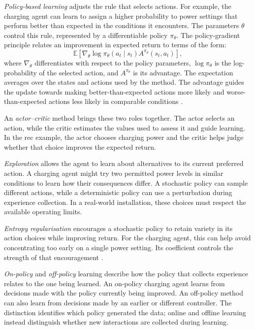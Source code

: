 \emph{Policy-based learning} adjusts the rule that selects actions. For example, the charging agent can learn to assign a higher probability to power settings that perform better than expected in the conditions it encounters. The parameters $\theta$ control this rule, represented by a differentiable policy $\pi_\theta$. The policy-gradient principle relates an improvement in expected return to terms of the form:
\begin{equation}
\mathbb E\!\left[\nabla_\theta\log\pi_\theta(a_t\mid s_t)
A^{\pi_\theta}(s_t,a_t)\right],
\label{eq:ch2-policy-gradient}
\end{equation}
where $\nabla_\theta$ differentiates with respect to the policy parameters, $\log\pi_\theta$ is the log-probability of the selected action, and $A^{\pi_\theta}$ is its advantage. The expectation averages over the states and actions used by the method. The advantage guides the update towards making better-than-expected actions more likely and worse-than-expected actions less likely in comparable conditions \parencite{sutton1999policygradient}.

An \emph{actor--critic} method brings these two roles together. The actor selects an action, while the critic estimates the values used to assess it and guide learning. In the \gls{rec} example, the actor chooses charging power and the critic helps judge whether that choice improves the expected return.

\emph{Exploration} allows the agent to learn about alternatives to its current preferred action. A charging agent might try two permitted power levels in similar conditions to learn how their consequences differ. A stochastic policy can sample different actions, while a deterministic policy can use a perturbation during experience collection. In a real-world installation, these choices must respect the available operating limits.

\emph{Entropy regularisation} encourages a stochastic policy to retain variety in its action choices while improving return. For the charging agent, this can help avoid concentrating too early on a single power setting. Its coefficient controls the strength of that encouragement \parencite{haarnoja2018sac}.

\emph{On-policy} and \emph{off-policy} learning describe how the policy that collects experience relates to the one being learned. An on-policy charging agent learns from decisions made with the policy currently being improved. An off-policy method can also learn from decisions made by an earlier or different controller. The distinction identifies which policy generated the data; online and offline learning instead distinguish whether new interactions are collected during learning.


